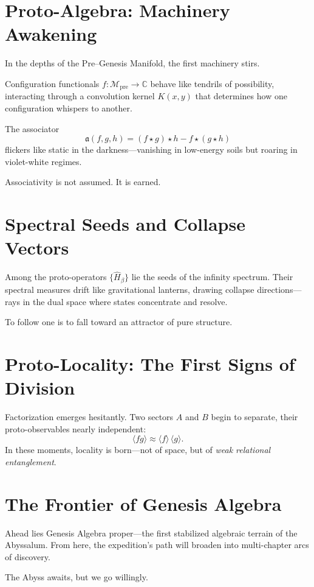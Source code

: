 \section{Proto-Algebra: Machinery Awakening}
In the depths of the Pre–Genesis Manifold, the first machinery stirs.

Configuration functionals $f : \mathcal{M}_{\mathrm{pre}} \to \mathbb{C}$ behave like tendrils of possibility,
interacting through a convolution kernel $K(x,y)$ that determines how one configuration whispers to another.

The associator
\[
\mathfrak{a}(f,g,h)
= (f \star g)\star h - f \star (g \star h)
\]
flickers like static in the darkness—vanishing in low-energy soils but roaring in violet-white regimes.

Associativity is not assumed.
It is earned.

\section{Spectral Seeds and Collapse Vectors}
Among the proto-operators $\{\hat{H}_\beta\}$ lie the seeds of the infinity spectrum.
Their spectral measures drift like gravitational lanterns, drawing collapse directions—
rays in the dual space where states concentrate and resolve.

To follow one is to fall toward an attractor of pure structure.

\section{Proto-Locality: The First Signs of Division}
Factorization emerges hesitantly. Two sectors $A$ and $B$ begin to separate,
their proto-observables nearly independent:
\[
\langle fg \rangle \approx \langle f \rangle\, \langle g \rangle.
\]
In these moments, locality is born—not of space, but of \emph{weak relational entanglement}.

\section{The Frontier of Genesis Algebra}
Ahead lies Genesis Algebra proper—the first stabilized algebraic terrain of the Abyssalum.
From here, the expedition’s path will broaden into multi-chapter arcs of discovery.

The Abyss awaits, but we go willingly.

